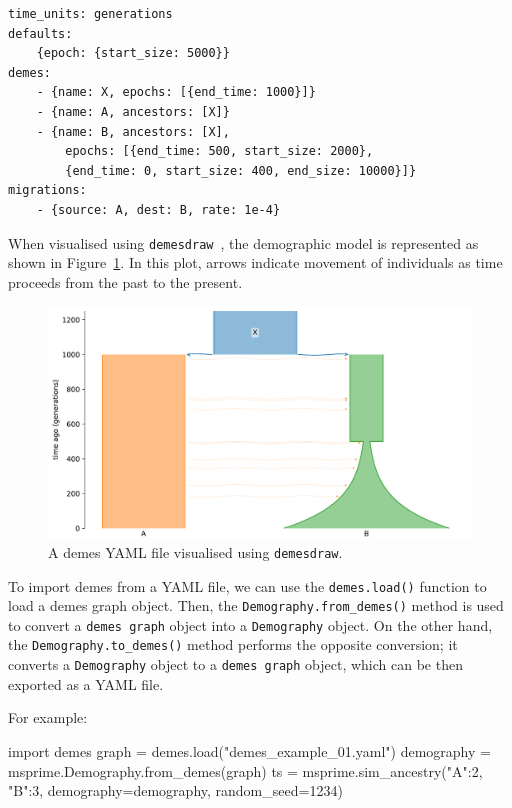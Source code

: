 \documentclass[graybox]{svmult}
\begin{document}
\begin{footnotesize}
\begin{verbatim}
time_units: generations
defaults:
    {epoch: {start_size: 5000}}
demes:
    - {name: X, epochs: [{end_time: 1000}]}
    - {name: A, ancestors: [X]}
    - {name: B, ancestors: [X],
        epochs: [{end_time: 500, start_size: 2000},
        {end_time: 0, start_size: 400, end_size: 10000}]}
migrations:
    - {source: A, dest: B, rate: 1e-4}

\end{verbatim}
\end{footnotesize}

When visualised using \texttt{demesdraw}~\citep{gower_grahamgowerdemesdraw_2024},
the demographic model is represented as shown in Figure~\ref{fig-demes-plot}.
 In this plot, arrows indicate movement of individuals as time proceeds from
the past to the present.

\begin{figure}[t]
\centering
\includegraphics[width=\textwidth]{images/demes.pdf}
\caption{\label{fig-demes-plot}A demes YAML file visualised using \texttt{demesdraw}.}
\end{figure}

To import demes from a YAML file, we can use the \texttt{demes.load()} function to
load a demes graph object. Then, the \texttt{Demography.from\_demes()} method is used to convert a
\texttt{demes graph} object into a \texttt{Demography} object. On the
other hand, the \texttt{Demography.to\_demes()} method performs the opposite conversion; it
converts a \texttt{Demography} object to a \texttt{demes graph} object, which can be then
exported as a YAML file.

For example:

\begin{pythoncode}
import demes
graph = demes.load("demes_example_01.yaml")
demography = msprime.Demography.from_demes(graph)
ts = msprime.sim_ancestry({"A":2, "B":3},
             demography=demography, random_seed=1234)
\end{pythoncode}
\end{document}
